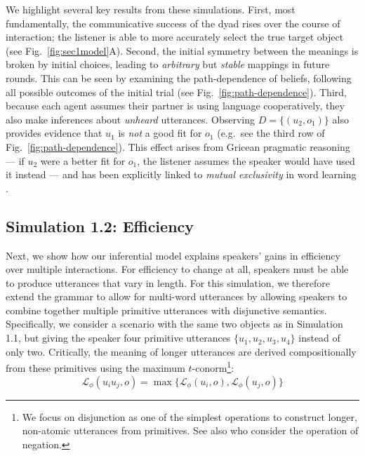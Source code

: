 We highlight several key results from these simulations.
First, most fundamentally, the communicative success of the dyad rises over the course of interaction; the listener is able to more accurately select the true target object (see Fig.~\ref{fig:sec1model}A). 
Second, the initial symmetry between the meanings is broken by initial choices, leading to \emph{arbitrary} but \emph{stable} mappings in future rounds.
This can be seen by examining the path-dependence of beliefs, following all possible outcomes of the initial trial (see Fig.~\ref{fig:path-dependence}). 
Third, because each agent assumes their partner is using language cooperatively, they also make inferences about \emph{unheard} utterances. 
Observing $D = \{(u_2, o_1)\}$ also provides evidence that $u_1$ is \emph{not} a good fit for $o_1$ (e.g.~see the third row of Fig.~\ref{fig:path-dependence}).
This effect arises from Gricean pragmatic reasoning --- if $u_2$ were a better fit for $o_1$, the listener assumes the speaker would have used it instead --- and has been explicitly linked to \emph{mutual exclusivity} in word learning \cite{FrankGoodmanTenenbaum09_Wurwur,smith_learning_2013}.

\subsection{Simulation 1.2: Efficiency}

Next, we show how our inferential model explains speakers' gains in efficiency over multiple interactions. 
For efficiency to change at all, speakers must be able to produce utterances that vary in length. 
For this simulation, we therefore extend the grammar to allow for multi-word utterances by allowing speakers to combine together multiple primitive utterances with disjunctive semantics.
Specifically, we consider a scenario with the same two objects as in Simulation 1.1, but giving the speaker four primitive utterances $\{u_1, u_2, u_3, u_4\}$ instead of only two. 
Critically, the meaning of longer utterances are derived compositionally from these primitives using the maximum $t$-conorm\footnote{We focus on disjunction as one of the simplest operations to construct longer, non-atomic utterances from primitives. See also  who consider the operation of negation.}:
$$\mathcal{L}_\phi(u_iu_j, o) = \max\{\mathcal{L}_\phi(u_i, o) , \mathcal{L}_\phi(u_j, o)\}$$


